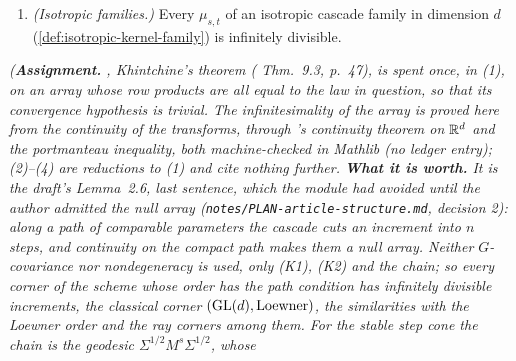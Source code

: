\begin{theorem}
\begin{enumerate}
(b) The ray order on $\PSD(d)$ (\ref{def:gw-cascade-family}): $\zeta(s) := s\,\Sigma'$ from
$\Sigma = 0$, and $\zeta(s) := (1 + s(c - 1))\,\Sigma$ from $\Sigma$ to $\Sigma' = c\,\Sigma$.
(c) Let $\mathcal K \subseteq \PD(d)$ satisfy $QMQ^{\tp} \in \mathcal K$ and $M^\tau \in \mathcal K$
whenever $M \in \mathcal K$, $Q \in \Orth(d)$ and $\tau \in [0,1]$. On $\mathcal P = \PD(d)$ write
$\Sigma \le_{\mathcal K} \Sigma'$ when $\Sigma^{-1/2}\Sigma'\Sigma^{-1/2} \in \mathcal K$, and suppose
that this relation is a partial order. Then it satisfies the hypothesis of (2) for every pair, with
$\zeta(s) := \Sigma^{1/2}M^s\Sigma^{1/2}$ and $M := \Sigma^{-1/2}\Sigma'\Sigma^{-1/2}$.
This covers the Loewner order on $\PD(d)$ ($\mathcal K = \{M : M \ge I\}$), the ray order on $\PD(d)$
($\mathcal K = \{cI : c \ge 1\}$), and for $0 < \alpha < 2$ the order of the stable step cone,
$\mathcal K_\alpha := \{M \in \PD(d) : \lambda_{\min}(M)^{d+\alpha} \ge \det M\}$ with $\lambda_{\min}(M)$ the
least eigenvalue; $\mathcal K_\alpha$ is the set of $e^X$ with $X$ symmetric and
$(d+\alpha)\lambda_{\min}(X) \ge \tr X$. These three relations are partial orders.
\item \emph{(Isotropic families.)} Every $\mu_{s,t}$ of an isotropic cascade family in dimension $d$
(\ref{def:isotropic-kernel-family}) is infinitely divisible.
\end{enumerate}
\statusA\quad{}\quad\emph{(\textbf{Assignment.} , Khintchine's theorem
( Thm.~9.3, p.~47), is spent once, in (1), on an array whose row products are
all equal to the law in question, so that its convergence hypothesis is trivial. The infinitesimality
of the array is proved here from the continuity of the transforms, through \Levy's continuity theorem
on $\mathbb{R}^d$ and the portmanteau inequality, both machine-checked in Mathlib (no ledger entry); (2)--(4)
are reductions to (1) and cite nothing further. \textbf{What it is worth.} It is the draft's
Lemma~2.6, last sentence, which the module had avoided until the author admitted the null array
(\texttt{notes/PLAN-article-structure.md}, decision 2): along a path of comparable parameters the
cascade cuts an increment into $n$ steps, and continuity on the compact path makes them a null array.
Neither $G$-covariance nor nondegeneracy is used, only (K1), (K2) and the chain; so every corner of
the scheme whose order has the path condition has infinitely divisible increments, the classical
corner $(\mathrm{GL}(d), \text{Loewner})$, the similarities with the Loewner order and the ray corners among
them. For the stable step cone the chain is the geodesic $\Sigma^{1/2}M^s\Sigma^{1/2}$, whose
}
\end{theorem}

